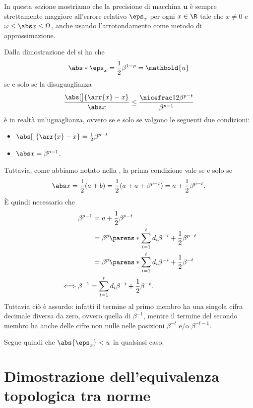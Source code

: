 In questa sezione mostriamo che la precisione di macchina $\mathbold{u}$ è sempre strettamente maggiore all'errore relativo $\eps_x$ per ogni $x \in \R$ tale che $x \neq 0$ e $\omega \leq \abs x \leq \Omega$, anche usando l'arrotondamento come metodo di approssimazione.

Dalla dimostrazione del  si ha che \[
    \abs*{\eps_x} = \frac12\beta^{1-p} = \mathbold{u}
\] se e solo se la disuguaglianza \[
    \frac{\abs[\big]{\arr{x} - x}}{\abs x} 
    \leq \frac{\nicefrac12\beta^{p-t}}{\beta^{p-1}}
\] è in realtà un'uguaglianza, ovvero se e solo se valgono le seguenti due condizioni:
\begin{itemize}
    \item $\abs[\big]{\arr{x} - x} = \frac12\beta^{p-t}$
    \item $\abs x = \beta^{p-1}$.
\end{itemize}
Tuttavia, come abbiamo notato nella , la prima condizione vale se e solo se \[
    \abs x = \frac12(a+b) = \frac12(a + a + \beta^{p-t}) = a + \frac12\beta^{p-t}.
\] È quindi necessario che \begin{align*}
    &\beta^{p-1} 
        \begin{aligned}[t] 
            &= a + \frac12\beta^{p-t} \\
            &= \beta^p \parens*{\sum_{i=1}^t d_i\beta^{-i}} + \frac12\beta^{p-t} \\
            &= \beta^p \parens*{\sum_{i=1}^t d_i\beta^{-i} + \frac12\beta^{-t}}
        \end{aligned} \\
    \iff &\beta^{-1} = \sum_{i=1}^t d_i\beta^{-i} + \frac12\beta^{-t}.
\end{align*} Tuttavia ciò è assurdo: infatti il termine al primo membro ha una singola cifra decimale diversa da zero, ovvero quella di $\beta^{-1}$, mentre il termine del secondo membro ha anche delle cifre non nulle nelle posizioni $\beta^{-t}$ e/o $\beta^{-t-1}$.  

Segue quindi che $\abs{\eps_x} < u$ in qualsiasi caso.

\section{Dimostrazione dell'equivalenza topologica tra norme}
\label{sec:eq_topo_norm}

